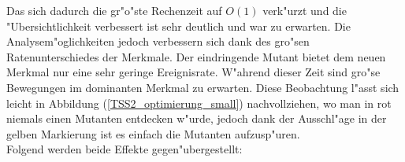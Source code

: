 \documentclass[11pt, a4paper, german]{article}
\theoremstyle{plain}
\begin{document}
	Das sich dadurch die gr"o"ste Rechenzeit auf $ O(1) $ verk"urzt und die "Ubersichtlichkeit verbessert ist sehr deutlich und war zu erwarten. Die Analysem"oglichkeiten jedoch verbessern sich dank des gro"sen Ratenunterschiedes der Merkmale. Der eindringende Mutant bietet dem neuen Merkmal nur eine sehr geringe Ereignisrate. W"ahrend dieser Zeit sind gro"se Bewegungen im dominanten Merkmal zu erwarten. Diese Beobachtung l"asst sich leicht in Abbildung (\ref{TSS2_optimierung_small}) nachvollziehen, wo man in rot niemals einen Mutanten entdecken w"urde, jedoch dank der Ausschl"age in der gelben Markierung ist es einfach die Mutanten aufzusp"uren.\\
	Folgend werden beide Effekte gegen"ubergestellt:\\
	\begin{center}
	\begin{minipage}{0.6\textwidth}
	\begin{minipage}{0.45\textwidth}
		\centering

\end{minipage}
\end{minipage}
\end{center}
\end{document}
